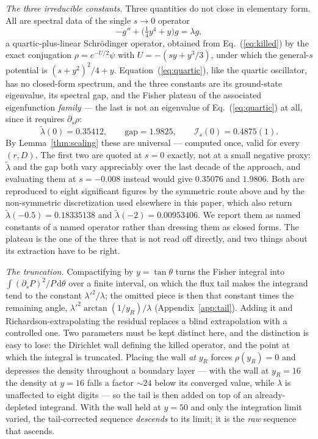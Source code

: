 \documentclass[%
 twocolumn,
 superscriptaddress,
 amsmath,amssymb,
 aps,
 pre,
 floatfix,
]{revtex4-2}
\newcommand{\dd}{\mathrm{d}}
\newcommand{\Ifish}{\mathcal{I}}
\begin{document}
\emph{The three irreducible constants.}  Three quantities do not close in elementary form.  All are spectral data of the single $s\to0$ operator
\begin{equation}
\label{eq:quartic}
-g''+\bigl(\tfrac14y^4+y\bigr)g=\lambda g,
\end{equation}
a quartic-plus-linear Schr\"odinger operator, obtained from Eq.~(\ref{eq:killed}) by the exact conjugation $\rho=e^{-U/2}\psi$ with $U=-(sy+y^3/3)$, under which the general-$s$ potential is $(s+y^2)^2/4+y$.  Equation~(\ref{eq:quartic}), like the quartic oscillator, has no closed-form spectrum, and the three constants are its ground-state eigenvalue, its spectral gap, and the Fisher plateau of the associated eigenfunction \emph{family} --- the last is not an eigenvalue of Eq.~(\ref{eq:quartic}) at all, since it requires $\partial_s\rho$:
\begin{equation}
\label{eq:constants}
\tilde\lambda(0)=0.35412,\qquad
\text{gap}=1.9825,\qquad
\Ifish_s(0)=0.4875(1).
\end{equation}
By Lemma~\ref{thm:scaling} these are universal --- computed once, valid for every $(r,D)$.  The first two are quoted at $s=0$ exactly, not at a small negative proxy: $\tilde\lambda$ and the gap both vary appreciably over the last decade of the approach, and evaluating them at $s=-0.008$ instead would give $0.35076$ and $1.9806$.  Both are reproduced to eight significant figures by the symmetric route above and by the non-symmetric discretization used elsewhere in this paper, which also return $\tilde\lambda(-0.5)=0.18335138$ and $\tilde\lambda(-2)=0.00953406$.  We report them as named constants of a named operator rather than dressing them as closed forms.  The plateau is the one of the three that is not read off directly, and two things about its extraction have to be right.

\emph{The truncation.}  Compactifying by $y=\tan\theta$ turns the Fisher integral into $\int(\partial_sP)^2/P\,\dd\theta$ over a finite interval, on which the flux tail makes the integrand tend to the constant $\lambda'^2/\lambda$; the omitted piece is then that constant times the remaining angle, $\lambda'^2\arctan(1/y_R)/\lambda$ (Appendix~\ref{app:tail}).  Adding it and Richardson-extrapolating the residual replaces a blind extrapolation with a controlled one.  Two parameters must be kept distinct here, and the distinction is easy to lose: the Dirichlet wall defining the killed operator, and the point at which the integral is truncated.  Placing the wall \emph{at} $y_R$ forces $\rho(y_R)=0$ and depresses the density throughout a boundary layer --- with the wall at $y_R=16$ the density at $y=16$ falls a factor ${\sim}24$ below its converged value, while $\lambda$ is unaffected to eight digits --- so the tail is then added on top of an already-depleted integrand.  With the wall held at $y=50$ and only the integration limit varied, the tail-corrected sequence \emph{descends} to its limit; it is the \emph{raw} sequence that ascends.
\end{document}

